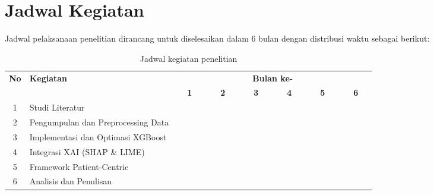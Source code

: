 \section{Jadwal Kegiatan}

Jadwal pelaksanaan penelitian dirancang untuk diselesaikan dalam 6 bulan dengan distribusi waktu sebagai berikut:

\begin{table}[h!]
  \centering
    \caption{Jadwal kegiatan penelitian}
  \label{jadwal}
  \begin{tabular}{|c|m{3.5cm}|m{0.01cm}|m{0.01cm}|m{0.01cm}|m{0.01cm}|m{0.01cm}|m{0.01cm}|m{0.01cm}|m{0.01cm}|m{0.01cm}|m{0.01cm}|m{0.01cm}|m{0.01cm}|m{0.01cm}|m{0.01cm}|m{0.01cm}|m{0.01cm}|m{0.01cm}|m{0.01cm}|m{0.01cm}|m{0.01cm}|m{0.01cm}|m{0.01cm}|m{0.01cm}|m{0.01cm}|}
    \hline
    \multirow{2}{*}{\textbf{No}} & \multirow{2}{*}{\textbf{Kegiatan}} & \multicolumn{24}{|c|}{\textbf{Bulan ke-}} \\
    \hhline{~~------------------------}
    {} & {} & \multicolumn{4}{|c|}{\textbf{1}} & \multicolumn{4}{|c|}{\textbf{2}} & \multicolumn{4}{|c|}{\textbf{3}} & \multicolumn{4}{|c|}{\textbf{4}} & \multicolumn{4}{|c|}{\textbf{5}} & \multicolumn{4}{|c|}{\textbf{6}}\\
    \hline
    1 & Studi Literatur & \cellcolor{blue!25} & \cellcolor{blue!25} & \cellcolor{blue!25} & \cellcolor{blue!25}& \cellcolor{blue!25} & \cellcolor{blue!25} & {} & {} & {} & {} & {} & {} & {} & {} & {} & {} & {} & {} & {} & {} & {} & {} & {} & {}\\
    \hline
    2 & Pengumpulan dan Preprocessing Data & {} & {} & \cellcolor{blue!25} & \cellcolor{blue!25} & \cellcolor{blue!25} & \cellcolor{blue!25} & {} & {} & {} & {} & {} & {}& {} & {} & {} & {}& {} & {} & {} & {}& {} & {} & {} & {}\\
    \hline
    3 & Implementasi dan Optimasi XGBoost &  {} & {} & {} & {}  & {} & {} & \cellcolor{blue!25} & \cellcolor{blue!25} & \cellcolor{blue!25} & \cellcolor{blue!25} & \cellcolor{blue!25} & \cellcolor{blue!25} & {} & {} & {} & {}& {} & {} & {} & {}& {} & {} & {} & {}\\
    \hline
    4 & Integrasi XAI (SHAP \& LIME) &  {} & {} & {} & {} & {} & {} & {} & {}& {} & {} & \cellcolor{blue!25} & \cellcolor{blue!25} & \cellcolor{blue!25} & \cellcolor{blue!25} & \cellcolor{blue!25} & \cellcolor{blue!25} & {} & {} & {} & {}& {} & {} & {} & {}\\
    \hline
    5 & Framework Patient-Centric &  {} & {} & {} & {} & {} & {} & {} & {}& {} & {} & {} & {} & {} & {} & \cellcolor{blue!25} & \cellcolor{blue!25} & \cellcolor{blue!25} & \cellcolor{blue!25} & \cellcolor{blue!25} & \cellcolor{blue!25} & {} & {} & {} & {}\\
    \hline
    6 & Analisis dan Penulisan & {} & {} & {} & {} & {} & {} & {} & {}& {} & {} & {} & {}& {} & {} & {} & {}& \cellcolor{blue!25} & \cellcolor{blue!25} & \cellcolor{blue!25} & \cellcolor{blue!25}& \cellcolor{blue!25} & \cellcolor{blue!25} & \cellcolor{blue!25} & \cellcolor{blue!25}\\
    \hline
  \end{tabular}

\end{table}
\newpage